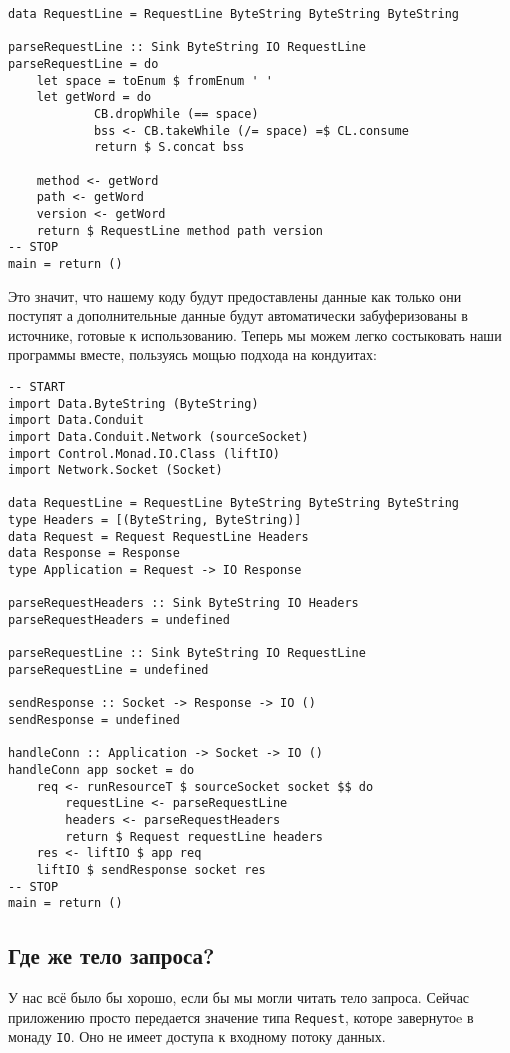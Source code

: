 {\begin{lstlisting}
data RequestLine = RequestLine ByteString ByteString ByteString

parseRequestLine :: Sink ByteString IO RequestLine
parseRequestLine = do
    let space = toEnum $ fromEnum ' '
    let getWord = do
            CB.dropWhile (== space)
            bss <- CB.takeWhile (/= space) =$ CL.consume
            return $ S.concat bss

    method <- getWord
    path <- getWord
    version <- getWord
    return $ RequestLine method path version
-- STOP
main = return ()
\end{lstlisting}
Это значит, что нашему коду будут предоставлены данные как только они поступят 
а дополнительные данные будут автоматически забуферизованы в источнике, 
готовые к использованию. Теперь мы можем легко состыковать наши программы 
вместе, пользуясь мощью подхода на кондуитах:
\begin{lstlisting}
-- START
import Data.ByteString (ByteString)
import Data.Conduit
import Data.Conduit.Network (sourceSocket)
import Control.Monad.IO.Class (liftIO)
import Network.Socket (Socket)

data RequestLine = RequestLine ByteString ByteString ByteString
type Headers = [(ByteString, ByteString)]
data Request = Request RequestLine Headers
data Response = Response
type Application = Request -> IO Response

parseRequestHeaders :: Sink ByteString IO Headers
parseRequestHeaders = undefined

parseRequestLine :: Sink ByteString IO RequestLine
parseRequestLine = undefined

sendResponse :: Socket -> Response -> IO ()
sendResponse = undefined

handleConn :: Application -> Socket -> IO ()
handleConn app socket = do
    req <- runResourceT $ sourceSocket socket $$ do
        requestLine <- parseRequestLine
        headers <- parseRequestHeaders
        return $ Request requestLine headers
    res <- liftIO $ app req
    liftIO $ sendResponse socket res
-- STOP
main = return ()
\end{lstlisting}
\subsection{Где же тело запроса?}
У нас всё было бы хорошо, если бы мы могли читать тело запроса. Сейчас
приложению просто передается значение типа \lstinline'Request', которе 
завернутоe в монаду \lstinline'IO'. 
Оно не имеет доступа к входному потоку данных.

}
